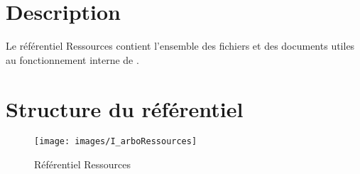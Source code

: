 \section{Description}

Le référentiel Ressources contient l'ensemble des fichiers et des documents utiles au fonctionnement
interne de \nomEquipe{}.

\section{Structure du référentiel}

\begin{figure}[ht]
         \begin{center}
         \texttt{[image: images/I\_arboRessources]}
         \end{center}
         \caption{Référentiel Ressources}
 \end{figure}


